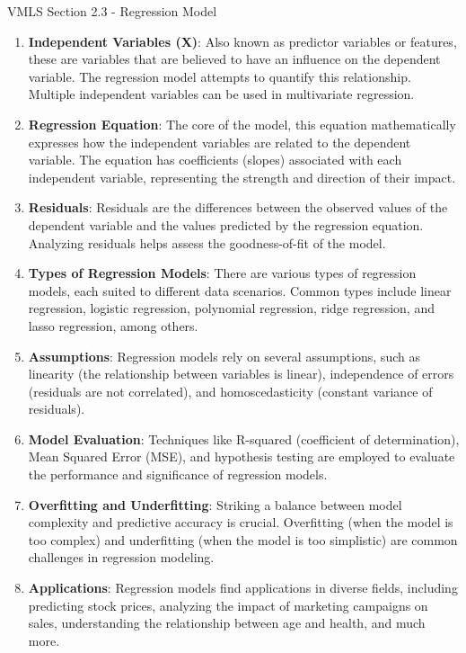 \begin{notes}{VMLS Section 2.3 - Regression Model}
\begin{enumerate}
        \item \textbf{Independent Variables (X)}: Also known as predictor variables or features, these are variables that are believed to have an influence on the dependent variable. The regression model attempts to quantify this relationship. 
        Multiple independent variables can be used in multivariate regression.
        
        \item \textbf{Regression Equation}: The core of the model, this equation mathematically expresses how the independent variables are related to the dependent variable. The equation has coefficients (slopes) associated with each independent 
        variable, representing the strength and direction of their impact.
        
        \item \textbf{Residuals}: Residuals are the differences between the observed values of the dependent variable and the values predicted by the regression equation. Analyzing residuals helps assess the goodness-of-fit of the model.
        
        \item \textbf{Types of Regression Models}: There are various types of regression models, each suited to different data scenarios. Common types include linear regression, logistic regression, polynomial regression, ridge regression, and 
        lasso regression, among others.
        
        \item \textbf{Assumptions}: Regression models rely on several assumptions, such as linearity (the relationship between variables is linear), independence of errors (residuals are not correlated), and homoscedasticity (constant variance of residuals).
        
        \item \textbf{Model Evaluation}: Techniques like R-squared (coefficient of determination), Mean Squared Error (MSE), and hypothesis testing are employed to evaluate the performance and significance of regression models.
        
        \item \textbf{Overfitting and Underfitting}: Striking a balance between model complexity and predictive accuracy is crucial. Overfitting (when the model is too complex) and underfitting (when the model is too simplistic) are common challenges 
        in regression modeling.
        
        \item \textbf{Applications}: Regression models find applications in diverse fields, including predicting stock prices, analyzing the impact of marketing campaigns on sales, understanding the relationship between age and health, and much more.
    \end{enumerate}
    

\end{notes}
